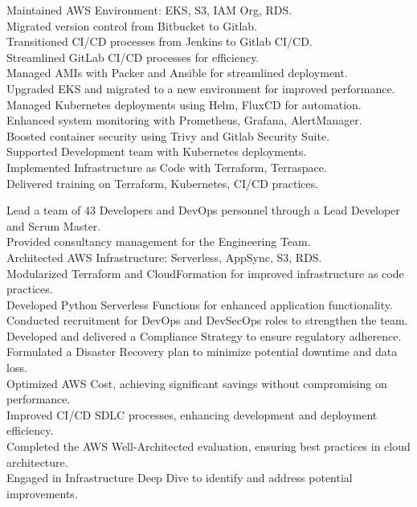 \documentclass[10pt,a4paper,sans]{moderncv} %
\begin{document}
{
	Maintained AWS Environment: EKS, S3, IAM Org, RDS.\\
	Migrated version control from Bitbucket to Gitlab.\\
	Transitioned CI/CD processes from Jenkins to Gitlab CI/CD.\\
	Streamlined GitLab CI/CD processes for efficiency.\\
	Managed AMIs with Packer and Ansible for streamlined deployment.\\
	Upgraded EKS and migrated to a new environment for improved performance.\\
	Managed Kubernetes deployments using Helm, FluxCD for automation.\\
	Enhanced system monitoring with Prometheus, Grafana, AlertManager.\\
	Boosted container security using Trivy and Gitlab Security Suite.\\
	Supported Development team with Kubernetes deployments.\\
	Implemented Infrastructure as Code with Terraform, Terraspace.\\
	Delivered training on Terraform, Kubernetes, CI/CD practices.\\
}

{
	Lead a team of 43 Developers and DevOps personnel through a Lead Developer and Scrum Master.\\
	Provided consultancy management for the Engineering Team.\\
	Architected AWS Infrastructure: Serverless, AppSync, S3, RDS.\\
	Modularized Terraform and CloudFormation for improved infrastructure as code practices.\\
	Developed Python Serverless Functions for enhanced application functionality.\\
	Conducted recruitment for DevOps and DevSecOps roles to strengthen the team.\\
	Developed and delivered a Compliance Strategy to ensure regulatory adherence.\\
	Formulated a Disaster Recovery plan to minimize potential downtime and data loss.\\
	Optimized AWS Cost, achieving significant savings without compromising on performance.\\
	Improved CI/CD SDLC processes, enhancing development and deployment efficiency.\\
	Completed the AWS Well-Architected evaluation, ensuring best practices in cloud architecture.\\
	Engaged in Infrastructure Deep Dive to identify and address potential improvements.\\
}
\end{document}
